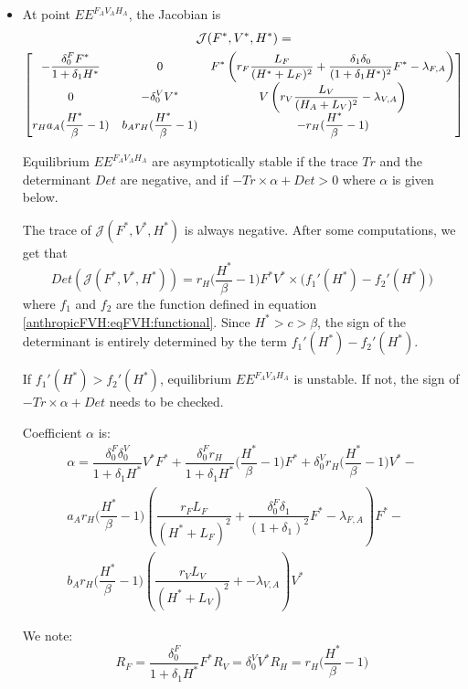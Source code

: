 \documentclass{article}
\newcommand{\lfa}{\lambda_{F, A}}
\newcommand{\lva}{\lambda_{V, A}}
\newcommand{\df}{\delta_0^F}
\newcommand{\dv}{\delta_0^V}
\begin{document}
\begin{itemize}
\item At point $EE^{F_AV_AH_A}$, the Jacobian is
\begin{multline}
\mathcal{J}(F^*,V^*,H^*) = \\
{\small
\begin{bmatrix}
-\dfrac{\df F^*}{1 + \delta_1 H^*} & 0 & F^*\left(r_F \dfrac{L_F}{(H^* + L_F)^2} + \dfrac{\delta_1 \delta_0}{(1 + \delta_1 H^*)^2}F^* - \lfa \right)\\
0 & - \dv V^* &V\left(r_V \dfrac{L_V}{(H_A+L_V)^2} - \lva \right) \\
r_H a_A (\dfrac{H^*}{\beta}-1) & b_A r_H (\dfrac{H^*}{\beta}-1) & -r_H (\dfrac{H^*}{\beta}-1)
\end{bmatrix}}
\label{anthropicFVH:eqFVH:jacobian}
\end{multline}

Equilibrium $EE^{F_AV_AH_A}$ are asymptotically stable if the trace $Tr$ and the determinant $Det$ are negative, and if $-Tr \times \alpha + Det > 0$ where $\alpha$ is given below.

The trace of $\mathcal{J}(F^*,V^*,H^*)$ is always negative. After some computations, we get that
$$
Det(\mathcal{J}(F^*,V^*,H^*)) = r_H \Big(\dfrac{H^*}{\beta}-1\Big) F^* V^* \times \Big(f_1'(H^*) - f_2'(H^*) \Big)
$$
where $f_1$ and $f_2$ are the function defined in equation \eqref{anthropicFVH:eqFVH:functional}. Since $H^* > c > \beta$, the sign of the determinant is entirely determined by the term $f_1'(H^*) - f_2'(H^*)$.

If $f_1'(H^*) > f_2'(H^*)$, equilibrium $EE^{F_AV_AH_A}$ is unstable. If not, the sign of $-Tr \times \alpha + Det$ needs to be checked.

Coefficient $\alpha$ is:
\begin{multline*}
\alpha = \dfrac{\df \dv }{1 + \delta_1 H^*}V^*F^* + \dfrac{\df r_H}{1 + \delta_1 H^*}\Big(\dfrac{H^*}{\beta}-1\Big)F^* + \dv r_H \Big(\dfrac{H^*}{\beta}-1\Big)V^* - \\
a_A r_H \Big(\dfrac{H^*}{\beta}-1\Big) \left(\dfrac{r_FL_F}{(H^* + L_F)^2} + \dfrac{\df \delta_1}{(1+\delta_1)^2}F^* -\lfa\right)F^* -\\
b_A r_H \Big(\dfrac{H^*}{\beta}-1\Big) \left(\dfrac{r_VL_V}{(H^* + L_V)^2} + -\lva\right)V^*
\end{multline*}

We note:
\begin{subequations}
\begin{equation}
R_F = \dfrac{\df}{1 + \delta_1 H^*} F^*
\end{equation}
\begin{equation}
R_V = \dv V^*
\end{equation}
\begin{equation}
R_H = r_H\Big(\dfrac{H^*}{\beta} - 1\Big)
\end{equation}
\end{subequations}



\end{itemize}
\end{document}
